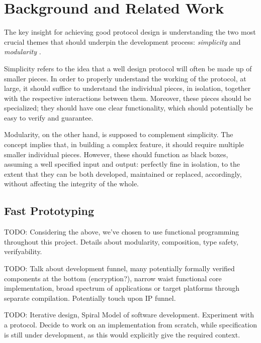 \chapter{Background and Related Work}
The key insight for achieving good protocol design is understanding the two most crucial themes that should underpin the development process: \textit{simplicity} and \textit{modularity} \cite{ProtocolDesign}.

Simplicity refers to the idea that a well design protocol will often be made up of smaller pieces. In order to properly understand the working of the protocol, at large, it should suffice to understand the individual pieces, in isolation, together with the respective interactions between them. Moreover, these pieces should be specialized; they should have one clear functionality, which should potentially be easy to verify and guarantee.

Modularity, on the other hand, is supposed to complement simplicity. The concept implies that, in building a complex feature, it should require multiple smaller individual pieces. However, these should function as black boxes, assuming a well specified input and output: perfectly fine in isolation, to the extent that they can be both developed, maintained or replaced, accordingly, without affecting the integrity of the whole.

\section{Fast Prototyping}
TODO: Considering the above, we've chosen to use functional programming throughout this project. Details about modularity, composition, type safety, verifyability.

TODO: Talk about development funnel, many potentially formally verified components at the bottom (encryption?), narrow waist functional core implementation, broad spectrum of applications or target platforms through separate compilation. Potentially touch upon IP funnel.

TODO: Iterative design, Spiral Model of software development. Experiment with a \wip protocol. Decide to work on an implementation from scratch, while specification is still under development, as this would explicitly give the required context.

